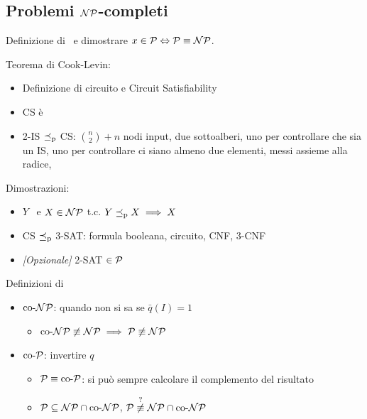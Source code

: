 \subsection{Problemi $\NP$-completi}

Definizione di \NPc\ e dimostrare $x \in \P \Leftrightarrow \P \equiv \NP$.

Teorema di Cook-Levin:
\begin{itemize}
	\item Definizione di circuito e Circuit Satisfiability

	\item CS è \NPc

	\item 2-IS $\polred$ CS: $\binom{n}{2} + n$ nodi input, due sottoalberi, uno per controllare che sia un IS, uno per controllare ci siano almeno due elementi, messi assieme alla radice,
\end{itemize}

Dimostrazioni:
\begin{itemize}
	\item $Y$ \NPc\ e $X \in \NP$ t.c. $Y \polred X \implies X$ \NPc

	\item CS $\polred$ 3-SAT: formula booleana, circuito, CNF, 3-CNF

	\item \textit{[Opzionale]} 2-SAT $\in \P$
\end{itemize}

Definizioni di
\begin{itemize}
	\item $\coNP$: quando non si sa se $\bar q(I) = 1$
	\begin{itemize}
		\item $\coNP \not \equiv \NP \implies \P \not \equiv \NP$
	\end{itemize}

	\item $\coP$: invertire $q$
	\begin{itemize}
		\item $\P \equiv \coP$: si può sempre calcolare il complemento del risultato

		\item $\P \subseteq \NP \cap \coNP$, $\P \stackrel{?}{\not \equiv} \NP \cap \coNP$
	\end{itemize}
\end{itemize}